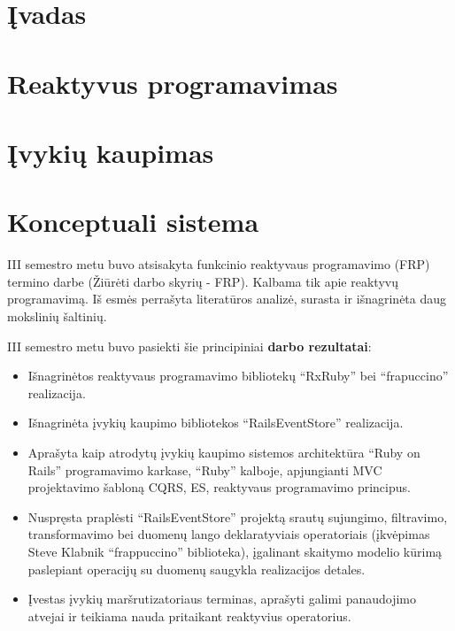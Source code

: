 \documentclass{VUMIFPSmagistrinis}
\begin{document}

\tableofcontents

\section{Įvadas}


\section{Reaktyvus programavimas}


\section{Įvykių kaupimas}


\section{Konceptuali sistema}



III semestro metu buvo atsisakyta funkcinio reaktyvaus programavimo (FRP) termino darbe (Žiūrėti darbo skyrių - FRP). Kalbama tik apie reaktyvų programavimą. Iš esmės perrašyta literatūros analizė, surasta ir išnagrinėta daug mokslinių šaltinių.

III semestro metu buvo pasiekti šie principiniai \textbf{darbo rezultatai}:

\begin{itemize}
  \item Išnagrinėtos reaktyvaus programavimo bibliotekų ``RxRuby'' bei ``frapuccino'' realizacija.
  \item Išnagrinėta įvykių kaupimo bibliotekos ``RailsEventStore'' realizacija.
  \item Aprašyta kaip atrodytų įvykių kaupimo sistemos architektūra ``Ruby on Rails'' programavimo karkase, ``Ruby'' kalboje, apjungianti MVC projektavimo šabloną CQRS, ES, reaktyvaus programavimo principus.
  \item Nuspręsta praplėsti ``RailsEventStore'' projektą srautų sujungimo, filtravimo, transformavimo bei duomenų lango deklaratyviais operatoriais (įkvėpimas Steve Klabnik ``frappuccino'' biblioteka), įgalinant skaitymo modelio kūrimą paslepiant operacijų su duomenų saugykla realizacijos detales.
  \item Įvestas įvykių maršrutizatoriaus terminas, aprašyti galimi panaudojimo atvejai ir teikiama nauda pritaikant reaktyvius operatorius.
\end{itemize}
\end{document}
